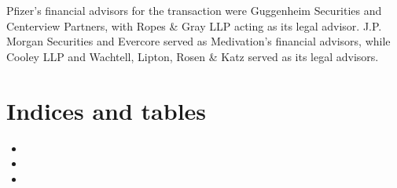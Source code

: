 \documentclass[letterpaper,12pt,english]{sphinxmanual}
\begin{document}
Pfizer’s financial advisors for the transaction were Guggenheim Securities and Centerview Partners, with Ropes \& Gray LLP acting as its legal advisor. J.P. Morgan Securities and Evercore served as Medivation’s financial advisors, while Cooley LLP and Wachtell, Lipton, Rosen \& Katz served as its legal advisors.


\chapter{Indices and tables}
\label{index:indices-and-tables}\begin{itemize}
\item {} 

\item {} 

\item {} 

\end{itemize}



\renewcommand{\indexname}{索引}
\printindex
\end{document}
